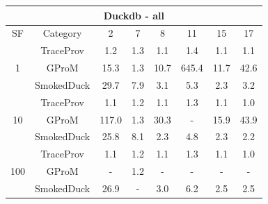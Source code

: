\begin{tabular}{|c|c|c|c|c|c|c|c|}
\hline
\multicolumn{8}{c}{Duckdb - all} \\
\hline
SF & Category & 2 & 7 & 8 & 11 & 15 & 17 \\  
 \hline 
 \multirow{3}{*}{1} & TraceProv & 1.2 & 1.3 & 1.1 & 1.4 & 1.1 & 1.1 \\  
 \cline{2-8} 
  & GProM & 15.3 & 1.3 & 10.7 & 645.4 & 11.7 & 42.6 \\  
 \cline{2-8} 
  & SmokedDuck & 29.7 & 7.9 & 3.1 & 5.3 & 2.3 & 3.2 \\  
 \hline 
 \multirow{3}{*}{10} & TraceProv & 1.1 & 1.2 & 1.1 & 1.3 & 1.1 & 1.0 \\  
 \cline{2-8} 
  & GProM & 117.0 & 1.3 & 30.3 & - & 15.9 & 43.9 \\  
 \cline{2-8} 
  & SmokedDuck & 25.8 & 8.1 & 2.3 & 4.8 & 2.3 & 2.2 \\  
 \hline 
 \multirow{3}{*}{100} & TraceProv & 1.1 & 1.2 & 1.1 & 1.3 & 1.1 & 1.0 \\  
 \cline{2-8} 
  & GProM & - & 1.2 & - & - & - & - \\  
 \cline{2-8} 
  & SmokedDuck & 26.9 & - & 3.0 & 6.2 & 2.5 & 2.5 \\ 
\hline
\end{tabular}